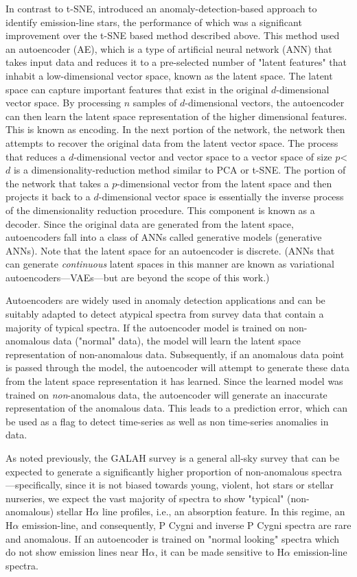 In contrast to t-SNE, \citet{vcotar2021galah} introduced an anomaly-detection-based approach to identify emission-line stars, the performance of which was a significant improvement over the t-SNE based method described above. This method used an autoencoder (AE), which is a type of artificial neural network (ANN) that takes input data and reduces it to a pre-selected number of "latent features" that inhabit a low-dimensional vector space, known as the latent space. The latent space can capture important features that exist in the original $d$-dimensional vector space. By processing $n$ samples of $d$-dimensional vectors, the autoencoder can then learn the latent space representation of the higher dimensional features. This is known as encoding. In the next portion of the network, the network then attempts to recover the original data from the latent vector space. The process that reduces a $d$-dimensional vector and vector space to a vector space of size $p$<$d$ is a dimensionality-reduction method similar to PCA or t-SNE. The portion of the network that takes a $p$-dimensional vector from the latent space and then projects it back to a $d$-dimensional vector space is essentially the inverse process of the dimensionality reduction procedure. This component is known as a decoder. Since the original data are generated from the latent space, autoencoders fall into a class of ANNs called generative models (generative ANNs). Note that the latent space for an autoencoder is discrete. (ANNs that can generate {\em continuous} latent spaces in this manner are known as variational autoencoders—VAEs—but are beyond the scope of this work.) 

Autoencoders are widely used in anomaly detection applications \citep{sakurada2014anomaly} and can be suitably adapted to detect atypical spectra from survey data that contain a majority of typical spectra. If the autoencoder model is trained on non-anomalous data ("normal" data), the model will learn the latent space representation of non-anomalous data. Subsequently, if an anomalous data point is passed through the model, the autoencoder will attempt to generate these data from the latent space representation it has learned. Since the learned model was trained on {\em non}-anomalous data, the autoencoder will generate an inaccurate representation of the anomalous data. This leads to a prediction error, which can be used as a flag to detect time-series as well as non time-series anomalies in data.

As noted previously, the GALAH survey is a general all-sky survey that can be expected to generate a significantly higher proportion of non-anomalous spectra—specifically, since it is not biased towards young, violent, hot stars or stellar nurseries, we expect the vast majority of spectra to show "typical" (non-anomalous) stellar H$\alpha$ line profiles, i.e., an absorption feature. In this regime, an H$\alpha$ emission-line, and consequently, P Cygni and inverse P Cygni spectra are rare and anomalous. If an autoencoder is trained on "normal looking" spectra which do not show emission lines near H$\alpha$, it can be made sensitive to H$\alpha$ emission-line spectra. 

